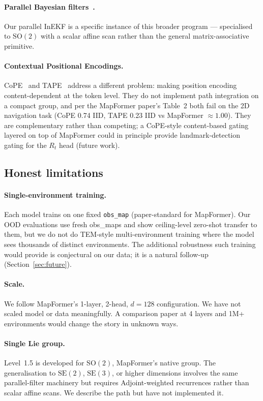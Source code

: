 \paragraph{Parallel Bayesian filters~\citep{sarkka2021parallel}.} Our
parallel InEKF is a specific instance of this broader program ---
specialised to $\mathrm{SO}(2)$ with a scalar affine scan rather than
the general matrix-associative primitive.

\paragraph{Contextual Positional Encodings.} CoPE~\citep{golovneva2024cope}
and TAPE~\citep{zhu2025tape} address a different problem: making
position encoding content-dependent at the token level. They do not
implement path integration on a compact group, and per the MapFormer
paper's Table~2 both fail on the 2D navigation task (CoPE 0.74 IID,
TAPE 0.23 IID vs MapFormer $\approx 1.00$). They are complementary
rather than competing; a CoPE-style content-based gating layered on top
of MapFormer could in principle provide landmark-detection gating for
the $R_t$ head (future work).

\subsection{Honest limitations}
\label{sec:discussion:limitations}

\paragraph{Single-environment training.} Each model trains on one fixed
\texttt{obs\_map} (paper-standard for MapFormer). Our OOD evaluations
use fresh obs\_maps and show ceiling-level zero-shot transfer to them,
but we do not do TEM-style multi-environment training where the model
sees thousands of distinct environments. The additional robustness such
training would provide is conjectural on our data; it is a natural
follow-up (Section~\ref{sec:future}).

\paragraph{Scale.} We follow MapFormer's 1-layer, 2-head, $d{=}128$
configuration. We have not scaled model or data meaningfully. A
comparison paper at 4 layers and 1M+ environments would change the story
in unknown ways.

\paragraph{Single Lie group.} Level~1.5 is developed for
$\mathrm{SO}(2)$, MapFormer's native group. The generalisation to
$\mathrm{SE}(2)$, $\mathrm{SE}(3)$, or higher dimensions involves the
same parallel-filter machinery but requires Adjoint-weighted
recurrences \citep{sola2018micro} rather than scalar affine scans. We
describe the path but have not implemented it.

